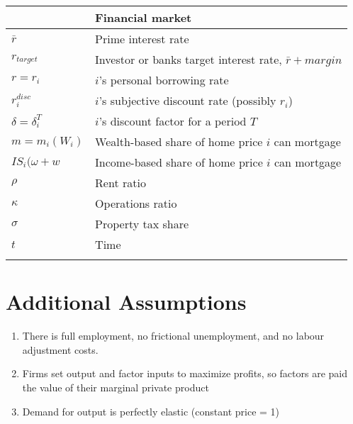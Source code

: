 \begin{longtable}{lp{10cm}}
\hline           & \textbf{Financial market} \\ \hline
$\bar r$         &  Prime interest rate      \\
$r_{target}$     &  Investor or banks target interest rate, $\bar r + margin$ \\
$r =  r_i$       &  $i$'s personal borrowing rate  \\
$r_i^{disc}$     &  $i$'s subjective discount rate (possibly $r_i$)           \\
$\delta = \delta_i^T$ &  $i$'s discount factor for a period $T$           \\
$m = m_i(W_i)$   &  Wealth-based share of home price $i$ can mortgage     \\
$IS_i(\omega+w$  &  Income-based share of home price $i$ can mortgage     \\
$\rho$           &  Rent ratio             \\
$\kappa$         &  Operations ratio       \\
$\sigma$         &  Property tax share     \\ %
$t$              &  Time                   \\
\hline
\color{black}
\end{longtable}  



\section{Additional Assumptions}
\begin{enumerate}
\item There is full employment, no frictional unemployment, and no labour adjustment costs.
\item Firms set output and factor inputs to maximize profits, so factors are paid the value of their marginal private product
\item Demand for output is perfectly elastic (constant price = 1)

\end{enumerate}

